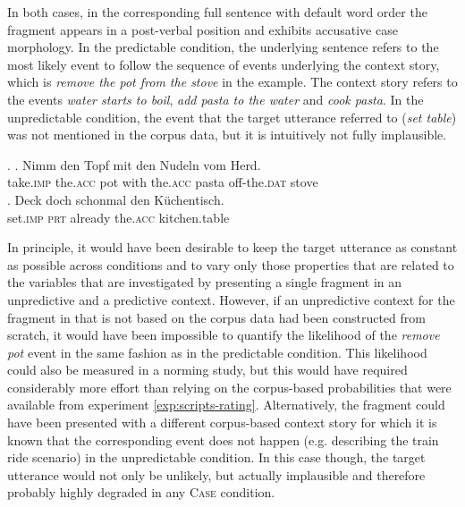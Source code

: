 In both cases, in the corresponding full sentence \Next with default word order the fragment appears in a post-verbal position and exhibits accusative case morphology. In the predictable condition, the underlying sentence \Next[a] refers to the most likely event to follow the sequence of events underlying the context story, which is \textit{remove the pot from the stove} in the example. The context story refers to the events \textit{water starts to boil}, \textit{add pasta to the water} and \textit{cook pasta}. In the unpredictable condition, the event that the target utterance \Next[b] referred to (\textit{set table}) was not mentioned in the corpus data, but it is intuitively not fully implausible.     
     
\ex. \ag. Nimm  den Topf mit den Nudeln vom Herd.\\
	  take.\textsc{imp} the.\textsc{acc} pot with the.\textsc{acc} pasta off-the.\textsc{dat} stove\\
     \bg. Deck doch schonmal den Küchentisch.\\
	  set.\textsc{imp} \textsc{prt} already the.\textsc{acc} kitchen.table\\

In principle, it would have been desirable to keep the target utterance as constant as possible across conditions and to vary only those properties that are related to the variables that are investigated by presenting a single fragment in an unpredictive and a predictive context. However, if an unpredictive context for the fragment in \LLast[a] that is not based on the corpus data had been constructed from scratch, it would have been impossible to quantify the likelihood of the \textit{remove pot} event in the same fashion as in the predictable condition. This likelihood could also be measured in a norming study, but this would have required considerably more effort than relying on the corpus-based probabilities that were available from experiment \ref{exp:scripts-rating}. Alternatively, the fragment could have been presented with a different corpus-based context story for which it is known that the corresponding event does not happen (e.g. describing the train ride scenario) in the unpredictable condition. In this case though, the target utterance would not only be unlikely, but actually implausible and therefore probably highly degraded in any \textsc{Case} condition.

